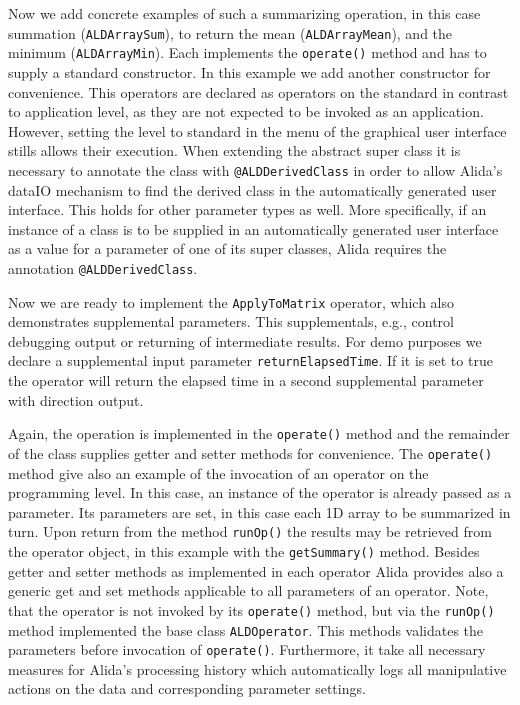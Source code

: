 \renewcommand{\codefile}{../../../../../../src/main/java/de/unihalle/informatik/Alida/demo/ALDSummarizeArrayOp.java}
\setcounter{off}{54}

Now we add concrete examples of such a summarizing operation, in this case
summation (\lstinline+ALDArraySum+), to return the mean (\lstinline+ALDArrayMean+), and the minimum (\lstinline+ALDArrayMin+).
Each implements the  \lstinline+operate()+ method and has to supply a standard constructor.
In this example we add another constructor for convenience.
This operators are declared as operators on the standard in contrast to 
application level, as they are not expected to be invoked as an application.
However, setting the level to standard in the menu of the graphical user interface
stills allows their execution.
When extending the abstract super class it is necessary to annotate the
class with \lstinline+@ALDDerivedClass+ in order to allow Alida's dataIO mechanism to find the derived class
in the automatically generated user interface.
This holds for other parameter types as well.
More specifically, if an instance of a class is to be supplied in an automatically 
generated user interface as a value for a parameter of one of its super classes,
Alida requires the annotation \lstinline+@ALDDerivedClass+.

\renewcommand{\codefile}{../../../../../../src/main/java/de/unihalle/informatik/Alida/demo/ALDArraySum.java}
\setcounter{off}{49}

Now we are ready to implement 
the \lstinline+ApplyToMatrix+ operator, which also demonstrates supplemental parameters.
This supplementals, e.g., control debugging output or returning of intermediate results.
For demo purposes we declare a supplemental input parameter \lstinline+returnElapsedTime+.
If it is set to true the operator will return the elapsed time in a second
supplemental parameter with direction output.

Again, the operation is implemented in the  \lstinline+operate()+ method and the remainder of the
class supplies getter and setter methods for convenience.
The  \lstinline+operate()+ method give also an example of the invocation of an operator on the
programming level.
In this case, an instance of the operator is already passed as a parameter.
Its parameters are set, in this case each 1D array to be summarized in turn.
Upon return from the method \lstinline+runOp()+ the results may be retrieved from the operator object,
in this example with the \lstinline+getSummary()+ method.
Besides getter and setter methods as implemented in each operator
Alida provides also a generic get and set methods applicable to
all parameters of an operator.
Note, that the operator is not invoked by its  \lstinline+operate()+ method, but via
the \lstinline+runOp()+ method implemented the base class \lstinline+ALDOperator+.
This methods validates the parameters before invocation of  \lstinline+operate()+.
Furthermore, it take all necessary measures for Alida's processing
history which automatically logs
all manipulative actions on the data and corresponding parameter settings. 

